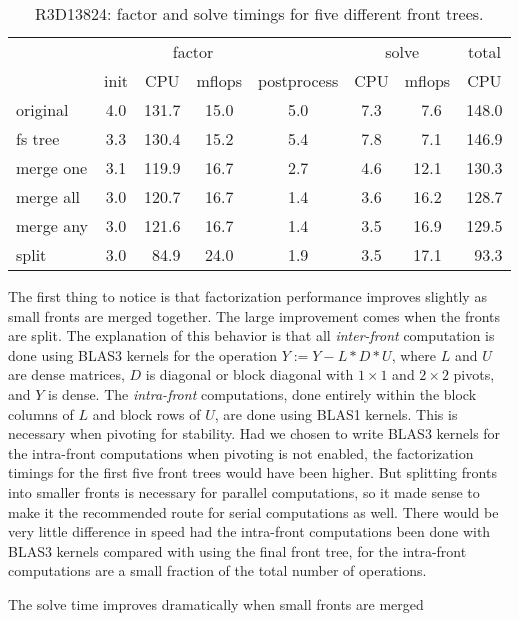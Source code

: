 \begin{table}[htbp]
\label{table:R3D13824-comp-stats}
\caption{R3D13824: 
         factor and solve timings for five different front trees.}
\begin{center}
\begin{tabular}{l|ccccccc}
& & \multicolumn{2}{c}{factor} & & \multicolumn{2}{c}{solve} & total \\
& init & CPU & mflops & postprocess & CPU & mflops & CPU \\ \hline
 original  & 4.0 & 131.7 & 15.0 & 5.0 & 7.3 & ~7.6 & 148.0 \\
 fs tree   & 3.3 & 130.4 & 15.2 & 5.4 & 7.8 & ~7.1 & 146.9 \\
 merge one & 3.1 & 119.9 & 16.7 & 2.7 & 4.6 & 12.1 & 130.3 \\
 merge all & 3.0 & 120.7 & 16.7 & 1.4 & 3.6 & 16.2 & 128.7 \\
 merge any & 3.0 & 121.6 & 16.7 & 1.4 & 3.5 & 16.9 & 129.5 \\
 split     & 3.0 & ~84.9 & 24.0 & 1.9 & 3.5 & 17.1 & ~93.3 
\end{tabular}
\end{center}
\end{table}
\par
The first thing to notice is that factorization performance improves
slightly as small fronts are merged together.
The large improvement comes when the fronts are split.
The explanation of this behavior is that all {\it inter-front}
computation is done using BLAS3 kernels for the operation
$Y := Y - L * D * U$, where $L$ and $U$ are dense matrices,
$D$ is diagonal or block diagonal with $1 \times 1$ and $2 \times 2$
pivots, and $Y$ is dense.
The {\it intra-front} computations, done entirely within the block
columns of $L$ and block rows of $U$, are done using BLAS1 kernels.
This is necessary when pivoting for stability.
Had we chosen to write BLAS3 kernels for the intra-front
computations when pivoting is not enabled, the factorization timings for
the first five front trees would have been higher.
But splitting fronts into smaller fronts is necessary for parallel
computations, so it made sense to make it the recommended route for
serial computations as well.
There would be very little difference in speed had the intra-front
computations been done with BLAS3 kernels compared with using the 
final front tree, for the intra-front computations are a small fraction
of the total number of operations.
\par
The solve time improves dramatically when small fronts are merged
